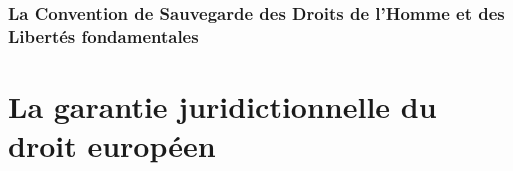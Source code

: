 \documentclass[10pt, a4paper, openany]{book}
\begin{document}
\section{La Convention de Sauvegarde des Droits de l'Homme et des Libertés fondamentales}


\part{La garantie juridictionnelle du droit européen}
\end{document}
